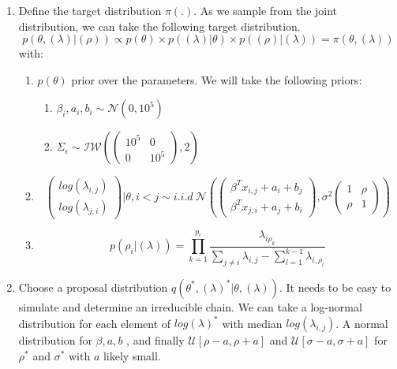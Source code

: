 \documentclass[12pt]{ociamthesis}  %
\begin{document}
	\begin{enumerate}
	
	\item Define the target distribution $\pi(.)$. As we sample from the joint distribution, we can take the following target distribution.
	\begin{equation}
	p(\theta, (\lambda)|(\rho)) \propto p(\theta) \times p((\lambda) | \theta)\times p((\rho)|(\lambda)) = \pi(\theta, (\lambda))
	\end{equation}
	with:
	\begin{enumerate}
	\item $p(\theta)$ prior over the parameters.
	We will take the following priors:
	\begin{enumerate}
		\item $\beta_{i}, a_{i}, b_{i} \sim \mathcal{N}(0, 10^{5})$
		\item $\Sigma_{\epsilon} \sim \mathcal{I}\mathcal{W}(\begin{pmatrix} 10^{5} & 0 \\ 0 & 10^{5} \end{pmatrix}, 2)$
	\end{enumerate}
	\item
	\begin{equation}
	\begin{pmatrix}
	log(\lambda_{i,j}) \\
	log(\lambda_{j,i})
	\end{pmatrix}
	|\theta , i < j \sim i.i.d \  \mathcal{N} (\begin{pmatrix} \beta^{T}x_{i,j} + a_{i} + b_{j} \\  \beta^{T}x_{j,i} + a_{j} + b_{i} \end{pmatrix}, \sigma^{2} \begin{pmatrix} 1 & \rho \\ \rho & 1 \end{pmatrix})
	\end{equation}
	\item 
	\begin{equation}
	p(\rho_{i} | (\lambda)) = \prod_{k = 1}^{p_{i}}\frac{\lambda_{i\rho_{k}}}{\sum_{j \neq i}\lambda_{i,j} - \sum_{l = 1}^{k - 1}\lambda_{i,\rho_{l}}  }
	\end{equation}
	\end{enumerate}
	\item Choose a proposal distribution $q(\theta^{*}, (\lambda)^{*} |\theta, (\lambda))$. It needs to be easy to simulate and determine an irreducible chain. We can take a log-normal distribution for each element of $log(\lambda)^{*}$ with median $log(\lambda_{i,j})$. A normal distribution for \boldmath $\beta, a, b$ \unboldmath, and finally $\mathcal{U}[\rho - a, \rho + a]$ and $\mathcal{U}[\sigma - a, \sigma + a]$ for $\rho^{*}$ and $\sigma^{*}$ with $a$ likely small.

\end{enumerate}
\end{document}
